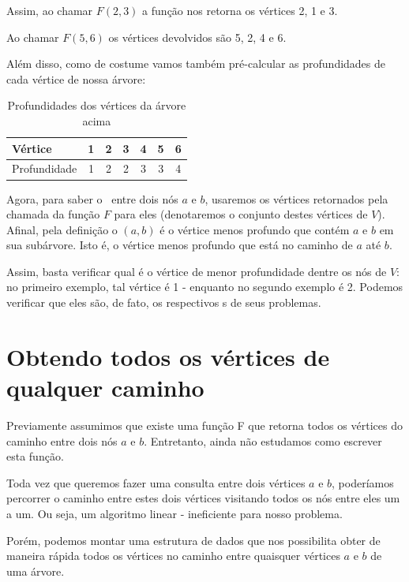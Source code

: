\vspace{0.5cm}

Assim, ao chamar $F(2, 3)$ a função nos retorna os vértices 2, 1 e 3.

Ao chamar $F(5, 6)$ os vértices devolvidos são 5, 2, 4 e 6.

Além disso, como de costume vamos também pré-calcular as profundidades de cada vértice de nossa árvore:

\begin{table}[htb]
\centering
\begin{tabular}{|l|c|c|c|c|c|c|}
\hline
Vértice      & 1 & 2 & 3 & 4 & 5 & 6  \\ \hline
Profundidade & 1 & 2 & 2 & 3 & 3 & 4 \\ \hline
\end{tabular}
\caption{Profundidades dos vértices da árvore acima}
\end{table}



Agora, para saber o \LCA\ entre dois nós $a$ e $b$, usaremos os vértices retornados pela chamada da função $F$ para eles (denotaremos o conjunto destes vértices de $V$). Afinal, pela definição o \LCA$(a, b)$ é o vértice menos profundo que contém $a$ e $b$ em sua subárvore. Isto é, o vértice menos profundo que está no caminho de $a$ até $b$.

Assim, basta verificar qual é o vértice de menor profundidade dentre os nós de $V$: no primeiro exemplo, tal vértice é 1 - enquanto no segundo exemplo é 2. Podemos verificar que eles são, de fato, os respectivos \LCA s de seus problemas.


\section{Obtendo todos os vértices de qualquer caminho}

Previamente assumimos que existe uma função F que retorna todos os vértices do caminho entre dois nós $a$ e $b$. Entretanto, ainda não estudamos como escrever esta função.

Toda vez que queremos fazer uma consulta entre dois vértices $a$ e $b$, poderíamos percorrer o caminho entre estes dois vértices visitando todos os nós entre eles um a um. Ou seja, um algoritmo linear - ineficiente para nosso problema.

Porém, podemos montar uma estrutura de dados que nos possibilita obter de maneira rápida todos os vértices no caminho entre quaisquer vértices $a$ e $b$ de uma árvore.


